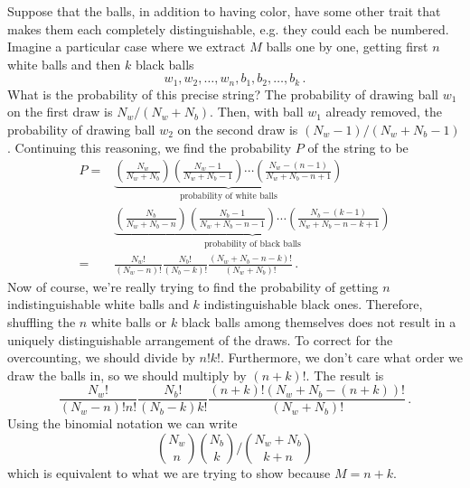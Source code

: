 Suppose that the balls, in addition to having color, have some other trait that makes them each completely distinguishable, e.g. they could each be numbered.
Imagine a particular case where we extract $M$ balls one by one, getting first $n$ white balls and then $k$ black balls
\begin{equation*}
  w_1, w_2, \ldots , w_n , b_1, b_2, \ldots , b_k
  \, .
\end{equation*}
What is the probability of this precise string?
The probability of drawing ball $w_1$ on the first draw is $N_w / (N_w + N_b)$.
Then, with ball $w_1$ already removed, the probability of drawing ball $w_2$ on the second draw is $(N_w - 1)/(N_w + N_b - 1)$.
Continuing this reasoning, we find the probability $P$ of the string to be
\begin{align*}
  P =&
  \underbrace{
    \left(
      \frac{N_w}{N_w + N_b}
    \right)
    \left(
      \frac{N_w - 1}{N_w + N_b -1}
    \right)
    \cdots
    \left(
      \frac{N_w - (n - 1)}{N_w + N_b - n + 1}
    \right)
  }_\text{probability of white balls} \\
  & \underbrace{
    \left(
      \frac{N_b}{N_w + N_b - n}
    \right)
    \left(
      \frac{N_b - 1}{N_w + N_b - n - 1}
    \right)
    \cdots
    \left(
      \frac{N_b - (k - 1)}{N_w + N_b - n - k + 1}
    \right)
  }_\text{probability of black balls} \\
  =&
  \frac{N_w!}{(N_w - n)!}
  \frac{N_b!}{(N_b - k)!}
  \frac{(N_w + N_b -n - k)!}{(N_w + N_b)!} \, .
\end{align*}
Now of course, we're really trying to find the probability of getting $n$ indistinguishable white balls and $k$ indistinguishable black ones.
Therefore, shuffling the $n$ white balls or $k$ black balls among themselves does not result in a uniquely distinguishable arrangement of the draws.
To correct for the overcounting, we should divide by $n! k!$.
Furthermore, we don't care what order we draw the balls in, so we should multiply by $(n + k)!$.
The result is
\begin{equation*}
  \frac{N_w!}{(N_w - n)! n!} \frac{N_b!}{(N_b - k)k!} \frac{(n + k)!(N_w + N_b - (n + k))!}{(N_w + N_b)!} \, .
\end{equation*}
Using the binomial notation we can write
\begin{equation*}
  \binom{N_w}{n} \binom{N_b}{k} / \binom{N_w + N_b}{k + n} 
\end{equation*}
which is equivalent to what we are trying to show because $M = n + k$.
